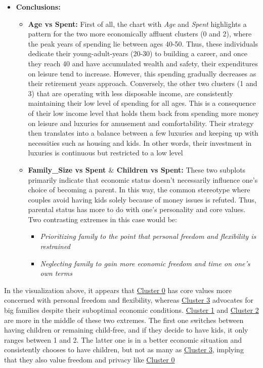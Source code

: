 \documentclass[11pt]{article}
\begin{document}
\begin{itemize}
	\item \textbf{Conclusions:}

\begin{itemize}
	\item \textbf{Age vs Spent:} First of all, the chart with \textit{Age} and \textit{Spent} highlights a pattern for the two more economically affluent clusters (0 and 2), where the peak years of spending lie between ages 40-50. Thus, these individuals dedicate their young-adult-years (20-30) to building a career, and once they reach 40 and have accumulated wealth and safety, their expenditures on leisure tend to increase. However, this spending gradually decreases as their retirement years approach. Conversely, the other two clusters (1 and 3) that are operating with less disposable income, are consistently maintaining their low level of spending for all ages. This is a consequence of their low income level that holds them back from spending more money on leisure and luxuries for amusement and comfortability. Their strategy then translates into a balance between a few luxuries and keeping up with necessities such as housing and kids. In other words, their investment in luxuries is continuous but restricted to a low level

    \item \textbf{Family\_Size vs Spent $\&$ Children vs Spent:} These two subplots primarily indicate that economic status doesn’t necessarily influence one’s choice of becoming a parent. In this way, the common stereotype where couples avoid having kids solely because of money issues is refuted. Thus, parental status has more to do with one’s personality and core values. Two contrasting extremes in this case would be:

\begin{itemize}
	\item \textit{Prioritizing family to the point that personal freedom and flexibility is restrained}

	\item \textit{Neglecting family to gain more economic freedom and time on one’s own terms}

\end{itemize}


\end{itemize}
\end{itemize}


In the visualization above, it appears that \uline{\textcolor[HTML]{BF9000}{Cluster 0}} has core values more concerned with personal freedom and flexibility, whereas \uline{\textcolor[HTML]{674EA7}{Cluster 3}} advocates for big families despite their suboptimal economic conditions. \uline{\textcolor[HTML]{0B5394}{Cluster 1}} and \uline{\textcolor[HTML]{38761D}{Cluster 2}} are more in the middle of these two extremes. The first one switches between having children or remaining child-free, and if they decide to have kids, it only ranges between 1 and 2. The latter one is in a better economic situation and consistently chooses to have children, but not as many as \uline{\textcolor[HTML]{674EA7}{Cluster 3}}, implying that they also value freedom and privacy like \uline{\textcolor[HTML]{BF9000}{Cluster 0}}
\end{document}
